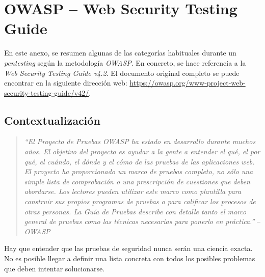 

\chapter{OWASP -- Web Security Testing Guide} \label{anx:owasp}

En este anexo, se resumen algunas de las categorías habituales durante un \textit{pentesting} según la metodología \textit{OWASP}. En concreto, se hace referencia a la \textit{Web Security Testing Guide v4.2}. El documento original completo se puede encontrar en la siguiente dirección web: \url{https://owasp.org/www-project-web-security-testing-guide/v42/}.

\section{Contextualización} \label{sec:owaspdef}

\begin{quotation}
    \textit{``El Proyecto de Pruebas OWASP ha estado en desarrollo durante muchos años. El objetivo del proyecto es ayudar a la gente a entender el qué, el por qué, el cuándo, el dónde y el cómo de las pruebas de las aplicaciones web. El proyecto ha proporcionado un marco de pruebas completo, no sólo una simple lista de comprobación o una prescripción de cuestiones que deben abordarse. Los lectores pueden utilizar este marco como plantilla para construir sus propios programas de pruebas o para calificar los procesos de otras personas. La Guía de Pruebas describe con detalle tanto el marco general de pruebas como las técnicas necesarias para ponerlo en práctica.''} -- \textit{OWASP}
\end{quotation}

Hay que entender que las pruebas de seguridad nunca serán una ciencia exacta. No es posible llegar a definir una lista concreta con todos los posibles problemas que deben intentar solucionarse.\sn

